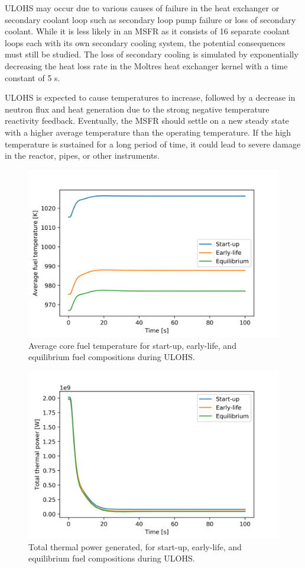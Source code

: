 \documentclass{anstrans}
\begin{document}
	\gls{ULOHS} may occur due to various causes of failure in the heat
	exchanger or secondary
	coolant loop such as secondary loop pump failure or loss of secondary
	coolant. While it is less likely in an \gls{MSFR} as it consists of 16
	separate coolant loops each with its own secondary cooling system, the
	potential consequences must still be studied.
	The loss of secondary cooling is simulated by exponentially decreasing
	the heat loss rate in the Moltres heat exchanger kernel with a time
	constant of 5 s.
	
	\gls{ULOHS} is expected to cause temperatures to increase,
	followed by a decrease in neutron flux and heat generation due to the
	strong negative temperature reactivity feedback. Eventually, the
	\gls{MSFR} should settle on a new steady state with a higher average
	temperature than the operating temperature. If the high temperature is
	sustained for a long period of time, it could lead to severe damage
	in the reactor, pipes, or other instruments.
	
\begin{figure}[t] 
	\centering
	\includegraphics[width=.53\textwidth]{./figures/loscatemp}
	\captionsetup{justification=centering}
	\caption{Average core fuel temperature for start-up, early-life, and
	equilibrium fuel compositions during \gls{ULOHS}.}
	\label{fig:loscatemp}
\end{figure} 
%
\begin{figure}[t] 
	\centering
	\includegraphics[width=.53\textwidth]{./figures/loscaheat}
	\captionsetup{justification=centering}
	\caption{Total thermal power generated, for start-up, early-life, and
	 equilibrium fuel compositions during \gls{ULOHS}.}
	\label{fig:loscaheat}
\end{figure} 
\end{document}
